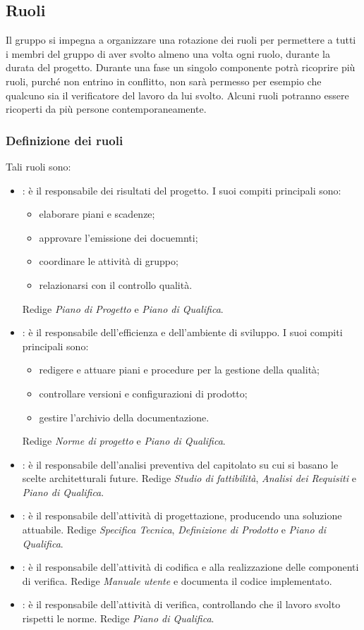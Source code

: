 \subsection{Ruoli}
Il gruppo \GroupName{} si impegna a organizzare una rotazione dei ruoli per permettere a tutti i membri del gruppo di aver svolto almeno una volta ogni ruolo, durante la durata del progetto. Durante una fase un singolo componente potrà ricoprire più ruoli, purché non entrino in conflitto, non sarà permesso per esempio che qualcuno sia il verificatore del lavoro da lui svolto. Alcuni ruoli potranno essere ricoperti da più persone contemporaneamente.
\subsubsection{Definizione dei ruoli}
Tali ruoli sono:
\begin{itemize}
	\item \Responsabile: è il responsabile dei risultati del progetto. I suoi compiti principali sono:
	\begin{itemize}
		\item elaborare piani e scadenze;
		\item approvare l'emissione dei docuemnti;
		\item coordinare le attività di gruppo;
		\item relazionarsi con il controllo qualità.
	\end{itemize}
	Redige \textit{Piano di Progetto} e \textit{Piano di Qualifica}.
	\item \Amministratore: è il responsabile dell'efficienza e dell'ambiente di sviluppo. I suoi compiti principali sono:
	\begin{itemize}
		\item redigere e attuare piani e procedure per la gestione della qualità;
		\item controllare versioni e configurazioni di prodotto;
		\item gestire l'archivio della documentazione.
	\end{itemize}
	Redige \textit{Norme di progetto} e \textit{Piano di Qualifica}.
	\item \Analista: è il responsabile dell'analisi preventiva del capitolato su cui si basano le scelte architetturali future.
	Redige \textit{Studio di fattibilità}, \textit{Analisi dei Requisiti} e \textit{Piano di Qualifica}.
	\item \Progettista: è il responsabile dell'attività di progettazione, producendo una soluzione attuabile.
	Redige \textit{Specifica Tecnica}, \textit{Definizione di Prodotto} e \textit{Piano di Qualifica}.
	\item \Programmatore: è il responsabile dell'attività di codifica e alla realizzazione delle componenti di verifica.
	Redige \textit{Manuale utente} e documenta il codice implementato.
	\item \Verificatore: è il responsabile dell'attività di verifica, controllando che il lavoro svolto rispetti le norme.
	Redige \textit{Piano di Qualifica}.
\end{itemize}
